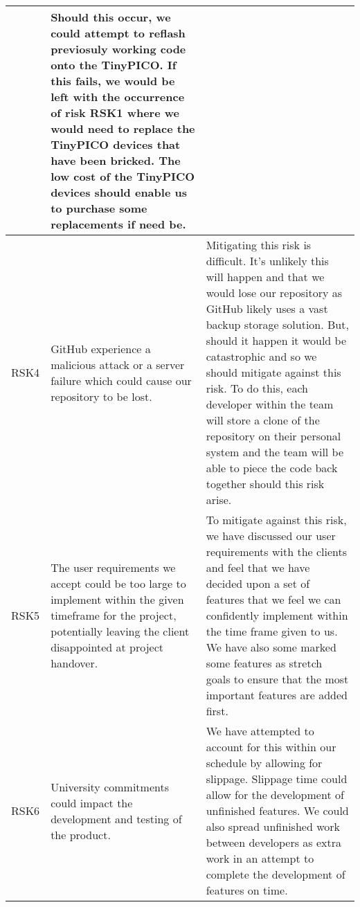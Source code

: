 \begin{xltabular}[H]{\textwidth}{c | X | X}
    &

    Should this occur, we could attempt to reflash previosuly working code onto the TinyPICO. If this fails, we would be left with the occurrence of risk RSK1 where we would need to replace the TinyPICO devices that have been bricked. The low cost of the TinyPICO devices should enable us to purchase some replacements if need be.\\

    \midrule

    RSK4

    &

    GitHub experience a malicious attack or a server failure which could cause our repository to be lost.

    &

    Mitigating this risk is difficult. It's unlikely this will happen and that we would lose our repository as GitHub likely uses a vast backup storage solution. But, should it happen it would be catastrophic and so we should mitigate against this risk. To do this, each developer within the team will store a clone of the repository on their personal system and the team will be able to piece the code back together should this risk arise.\\

    \midrule

    RSK5

    &

    The user requirements we accept could be too large to implement within the given timeframe for the project, potentially leaving the client disappointed at project handover.

    &

    To mitigate against this risk, we have discussed our user requirements with the clients and feel that we have decided upon a set of features that we feel we can confidently implement within the time frame given to us. We have also some marked some features as stretch goals to ensure that the most important features are added first.\\

    \midrule

    RSK6

    &

    University commitments could impact the development and testing of the product.

    &

    We have attempted to account for this within our schedule by allowing for slippage. Slippage time could allow for the development of unfinished features. We could also spread unfinished work between developers as extra work in an attempt to complete the development of features on time.\\


\end{xltabular}
